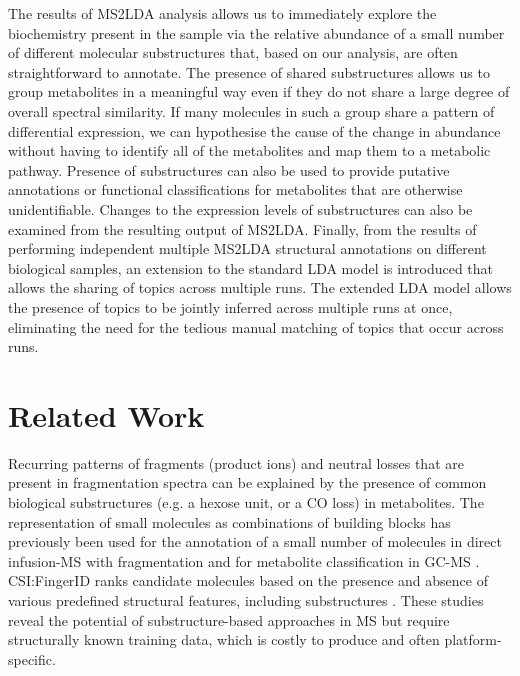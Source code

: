 The results of MS2LDA analysis allows us to immediately explore the biochemistry present in the sample via the relative abundance of a small number of different molecular substructures that, based on our analysis, are often straightforward to annotate. The presence of shared substructures allows us to group metabolites in a meaningful way even if they do not share a large degree of overall spectral similarity. If many molecules in such a group share a pattern of differential expression, we can hypothesise the cause of the change in abundance without having to identify all of the metabolites and map them to a metabolic pathway. Presence of substructures can also be used to provide putative annotations or functional classifications for metabolites that are otherwise unidentifiable. Changes to the expression levels of substructures can also be examined from the resulting output of MS2LDA. Finally, from the results of performing independent multiple MS2LDA structural annotations on different biological samples, an extension to the standard LDA model is introduced that allows the sharing of topics across multiple runs. The extended LDA model allows the presence of topics to be jointly inferred across multiple runs at once, eliminating the need for the tedious manual matching of topics that occur across runs.

\section{Related Work}

Recurring patterns of fragments (product ions) and neutral losses that are present in fragmentation spectra can be explained by the presence of common biological substructures (e.g. a hexose unit, or a CO loss) in metabolites. The representation of small molecules as combinations of building blocks has previously been used for the annotation of a small number of molecules in direct infusion-MS with fragmentation \cite{Sweeney2014} and for metabolite classification in GC-MS \cite{Scott1994, Hummel2010}. CSI:FingerID ranks candidate molecules based on the presence and absence of various predefined structural features, including substructures \cite{Duhrkop2015}. These studies reveal the potential of substructure-based approaches in MS but require structurally known training data, which is costly to produce and often platform-specific. 

